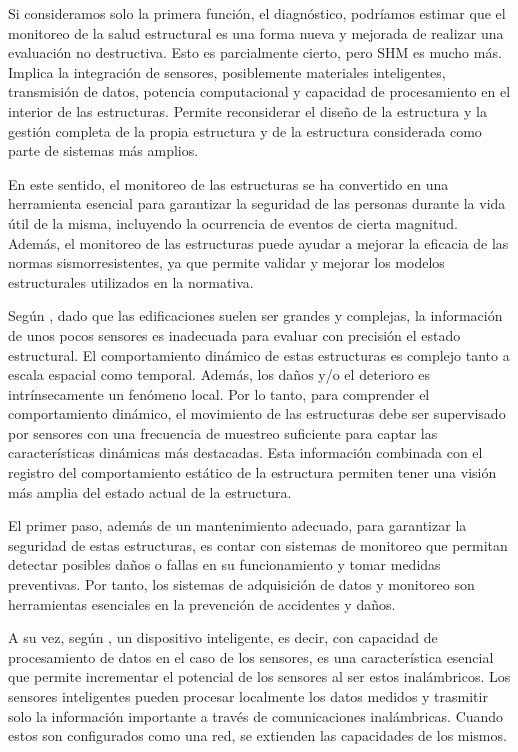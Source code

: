 Si consideramos solo la primera función, el diagnóstico, podríamos estimar que el monitoreo de la salud estructural es una forma nueva y mejorada de realizar una evaluación no destructiva. Esto es parcialmente cierto, pero SHM es mucho más. Implica la integración de sensores, posiblemente materiales inteligentes, transmisión de datos, potencia computacional y capacidad de procesamiento en el interior de las estructuras. Permite reconsiderar el diseño de la estructura y la gestión completa de la propia estructura y de la estructura considerada como parte de sistemas más amplios.



En este sentido, el monitoreo de las estructuras se ha convertido en una herramienta esencial para garantizar la seguridad de las personas durante la vida útil de la misma, incluyendo la ocurrencia de eventos de cierta magnitud. Además, el monitoreo de las estructuras puede ayudar a mejorar la eficacia de las normas sismorresistentes, ya que permite validar y mejorar los modelos estructurales utilizados en la normativa.

Según \citet{nagayama2007structural}, dado que las edificaciones suelen ser grandes y complejas, la información
de unos pocos sensores es inadecuada para evaluar con precisión el estado estructural. El
comportamiento dinámico de estas estructuras es complejo tanto a escala espacial como temporal. Además,
los daños y/o el deterioro es intrínsecamente un fenómeno local. Por lo tanto, para comprender el
comportamiento dinámico, el movimiento de las estructuras debe ser supervisado por sensores
con una frecuencia de muestreo suficiente para captar las características dinámicas más destacadas. Esta información combinada con el registro del comportamiento estático de la estructura permiten tener una visión más amplia del estado actual de la estructura.


El primer paso, además de un mantenimiento adecuado, para garantizar la seguridad de estas estructuras, es contar con sistemas de monitoreo que permitan detectar posibles daños o fallas en su funcionamiento y tomar medidas preventivas. Por tanto, los sistemas de adquisición de datos y monitoreo son herramientas esenciales en la prevención de accidentes y daños.

A su vez, según \citet{nagayama2007structural}, un dispositivo inteligente, es decir, con capacidad de procesamiento de datos en el caso de los sensores, es una característica esencial que permite incrementar el potencial de los sensores al ser estos inalámbricos. Los sensores inteligentes pueden procesar localmente los datos medidos y trasmitir solo la información importante a través de comunicaciones inalámbricas. Cuando estos son configurados como una red, se extienden las capacidades de los mismos.


